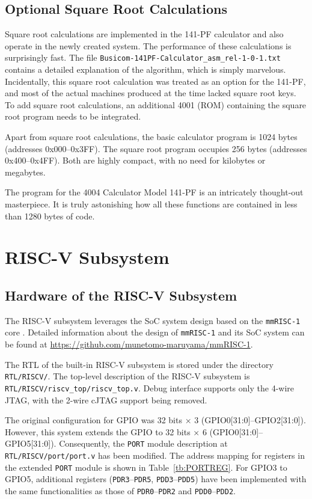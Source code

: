 \subsection{Optional Square Root Calculations}
Square root calculations are implemented in the 141-PF calculator and also operate in the newly created system. The performance of these calculations is surprisingly fast. The file \texttt{Busicom-141PF-Calculator\_asm\_rel-1-0-1.txt} contains a detailed explanation of the algorithm, which is simply marvelous. Incidentally, this square root calculation was treated as an option for the 141-PF, and most of the actual machines produced at the time lacked square root keys. To add square root calculations, an additional 4001 (ROM) containing the square root program needs to be integrated. 

Apart from square root calculations, the basic calculator program is 1024 bytes (addresses 0x000–0x3FF). The square root program occupies 256 bytes (addresses 0x400–0x4FF). Both are highly compact, with no need for kilobytes or megabytes. 

The program for the 4004 Calculator Model 141-PF is an intricately thought-out masterpiece. It is truly astonishing how all these functions are contained in less than 1280 bytes of code.

\section{RISC-V Subsystem}
\subsection{Hardware of the RISC-V Subsystem}
The RISC-V subsystem leverages the SoC system design based on the \texttt{mmRISC-1} core \cite{mmRISC-1}. Detailed information about the design of \texttt{mmRISC-1} and its SoC system can be found at \url{https://github.com/munetomo-maruyama/mmRISC-1}.

The RTL of the built-in RISC-V subsystem is stored under the directory \texttt{RTL/RISCV/}. The top-level description of the RISC-V subsystem is \texttt{RTL/RISCV/riscv\_top/riscv\_top.v}. Debug interface supports only the 4-wire JTAG, with the 2-wire cJTAG support being removed.

The original configuration for GPIO was 32 bits × 3 (GPIO0[31:0]–GPIO2[31:0]). However, this system extends the GPIO to 32 bits × 6 (GPIO0[31:0]–GPIO5[31:0]). Consequently, the \texttt{PORT} module description at \texttt{RTL/RISCV/port/port.v} has been modified. The address mapping for registers in the extended \texttt{PORT} module is shown in Table~\ref{tb:PORTREG}. For GPIO3 to GPIO5, additional registers (\texttt{PDR3}–\texttt{PDR5}, \texttt{PDD3}–\texttt{PDD5}) have been implemented with the same functionalities as those of \texttt{PDR0}–\texttt{PDR2} and \texttt{PDD0}–\texttt{PDD2}.

